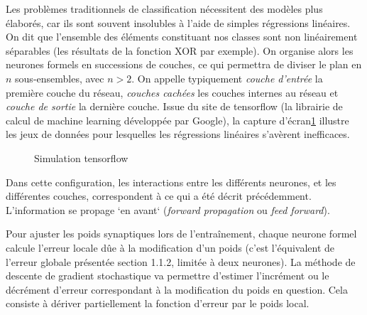 \documentclass[a4paper,10pt]{report}
\begin{document}
Les problèmes traditionnels de classification nécessitent des modèles plus élaborés, car ils sont souvent insolubles à l'aide de simples régressions linéaires. On dit que l'ensemble des éléments constituant nos classes
sont non linéairement séparables (les résultats de la fonction XOR par exemple). On organise alors les neurones formels en successions de couches, ce qui permettra de diviser le plan en $n$ sous-ensembles, avec $n >2$.
On appelle typiquement \textit{couche d'entrée} la première couche du réseau, \textit{couches cachées} les couches internes au réseau et \textit{couche de sortie} la dernière couche.
Issue du site de tensorflow\cite{Bib_PlaygroundTF} (la librairie de calcul de machine learning développée par Google\cite{Bib_TenFlo}), la capture d'écran\ref{fig:c1p2s2} illustre les jeux de données pour lesquelles les régressions linéaires s'avèrent inefficaces.

\begin{figure}[H]
    \centering
    \caption{Simulation tensorflow}
    \label{fig:c1p2s2}
\end{figure}


Dans cette configuration, les interactions entre les différents neurones, et les différentes couches, correspondent à ce qui a été décrit précédemment. L'information se propage `en avant` (\textit{forward propagation} ou \textit{feed forward}).
\par
Pour ajuster les poids synaptiques lors de l'entraînement, chaque neurone formel calcule l'erreur locale dûe à la modification d'un poids (c'est l'équivalent de l'erreur globale présentée section 1.1.2, limitée à deux neurones).
La méthode de descente de gradient stochastique\cite{Bib_WikiSGD} va permettre d'estimer l'incrément ou le décrément d'erreur correspondant à la modification du poids en question. Cela consiste à dériver partiellement la fonction d'erreur par le poids local.
\end{document}

